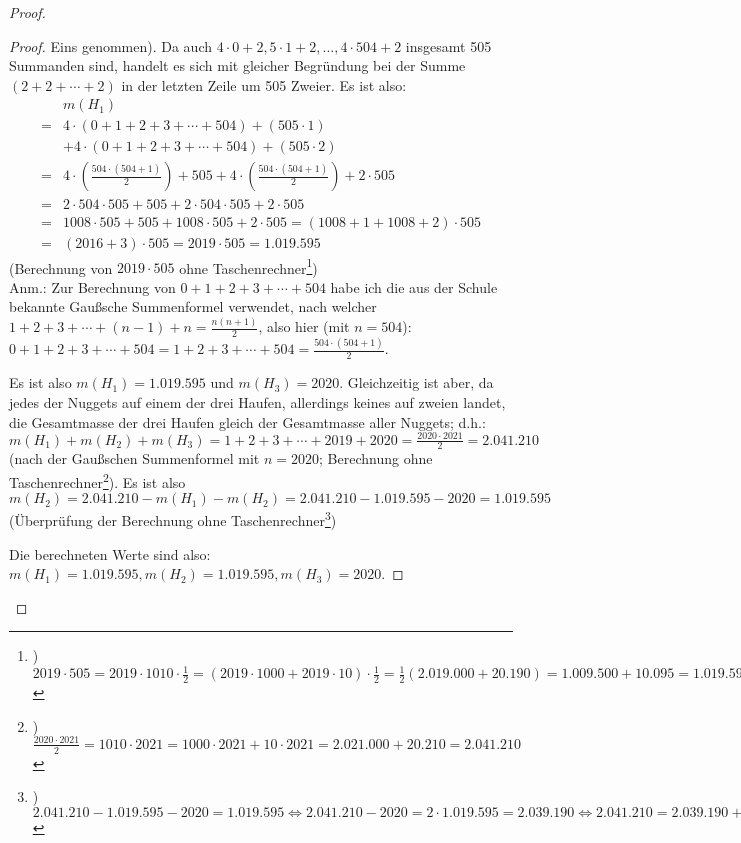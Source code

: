 \begin{proof}
\begin{proof}
        Eins genommen). Da auch $4\cdot0+2,5\cdot1+2,\ldots,4\cdot504+2$ insgesamt 505 Summanden sind, handelt es sich 
        mit gleicher Begründung bei der Summe $(2+2+\cdots+2)$ in der letzten Zeile um 505 Zweier. Es ist also:
        \begin{align*}
            &m(H_1)\\
            = &4\cdot(0+1+2+3+\cdots+504)+(505\cdot1)\\
            &+4\cdot(0+1+2+3+\cdots+504)+(505\cdot2)\\
            = &4\cdot\left(\frac{504\cdot(504+1)}{2}\right)+505
            +4\cdot\left(\frac{504\cdot(504+1)}{2}\right)+2\cdot 505\\
            =&2\cdot504\cdot505+505+2\cdot 504\cdot505+2\cdot505\\
            =&1008\cdot505+505+1008\cdot505+2\cdot505=(1008+1+1008+2)\cdot 505\\
            =&(2016+3)\cdot 505=2019\cdot505= 1.019.595
        \end{align*}
        (Berechnung von $2019\cdot 505$ ohne Taschenrechner\footnote{) $2019\cdot 505= 2019\cdot 1010 \cdot \frac12
        =(2019\cdot 1000+2019\cdot 10)\cdot \frac12=\frac12(2.019.000+20.190)=1.009.500+10.095=1.019.595$})\\
        Anm.: Zur Berechnung von $0+1+2+3+\cdots+504$ habe ich die aus der Schule bekannte Gaußsche Summenformel 
        verwendet, nach welcher $1+2+3+\cdots+(n-1)+n=\frac{n(n+1)}{2}$, also hier (mit $n=504$): 
        $0+1+2+3+\cdots+504=1+2+3+\cdots+504=\frac{504\cdot(504+1)}{2}$.

        Es ist also $m(H_1)= 1.019.595$ und $m(H_3)=2020$. Gleichzeitig ist aber, da jedes der Nuggets auf einem der 
        drei Haufen, allerdings keines auf zweien landet, die Gesamtmasse der drei Haufen gleich der Gesamtmasse 
        aller Nuggets; d.h.: $m(H_1)+m(H_2)+m(H_3)=1+2+3+\cdots+2019+2020=\frac{2020\cdot2021}{2}=2.041.210$ (nach der 
        Gaußschen Summenformel mit $n=2020$; Berechnung ohne Taschenrechner\footnote{) $\frac{2020\cdot2021}{2}=1010
        \cdot2021=1000\cdot2021+10\cdot2021=2.021.000+20.210=2.041.210$}). Es ist also $m(H_2)=2.041.210-m(H_1)-m(H_2) 
        = 2.041.210-1.019.595-2020=1.019.595$ (Überprüfung der Berechnung ohne Taschenrechner\footnote{) $2.041.210
        -1.019.595-2020=1.019.595\Leftrightarrow 2.041.210-2020=2\cdot 1.019.595=2.039.190\Leftrightarrow 2.041.210
        =2.039.190+2020=2.039.210+2000=2.041.210$})

        Die berechneten Werte sind also: $m(H_1)=1.019.595, m(H_2)=1.019.595, m(H_3)=2020$.


\end{proof}
\end{proof}
